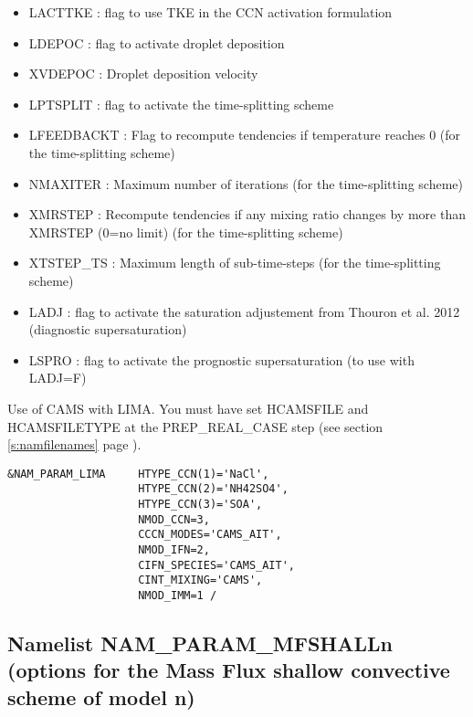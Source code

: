 \begin{itemize}
\item LACTTKE :  flag to use TKE in the CCN activation formulation
\item LDEPOC :  flag to activate droplet deposition
\item XVDEPOC : Droplet deposition velocity
\item LPTSPLIT : flag to activate the time-splitting scheme
\item LFEEDBACKT : Flag to recompute tendencies if temperature reaches 0 (for the time-splitting scheme)
\item NMAXITER : Maximum number of iterations (for the time-splitting scheme)
\item XMRSTEP : Recompute tendencies if any mixing ratio changes by more than XMRSTEP (0=no limit) (for the time-splitting scheme)
\item XTSTEP\_TS : Maximum length of sub-time-steps (for the time-splitting scheme)
\item 
{}
LADJ : flag to activate the saturation adjustement from Thouron et al. 2012 (diagnostic supersaturation)
\item
{}
LSPRO : flag to activate the prognostic supersaturation (to use with LADJ=F)
\end{itemize}

Use of CAMS with LIMA. You must have set HCAMSFILE and HCAMSFILETYPE at the PREP\_REAL\_CASE step (see section \ref{s:namfilenames} page \pageref{s:namfilenames}).
\begin{verbatim}
&NAM_PARAM_LIMA 	HTYPE_CCN(1)='NaCl',
                	HTYPE_CCN(2)='NH42SO4',
                	HTYPE_CCN(3)='SOA',
                	NMOD_CCN=3,
                	CCCN_MODES='CAMS_AIT',
                	NMOD_IFN=2,
                	CIFN_SPECIES='CAMS_AIT',
                	CINT_MIXING='CAMS',
                	NMOD_IMM=1 /
\end{verbatim}
\subsection{Namelist NAM\_PARAM\_MFSHALLn (options for the Mass Flux shallow convective
scheme of model n)}

